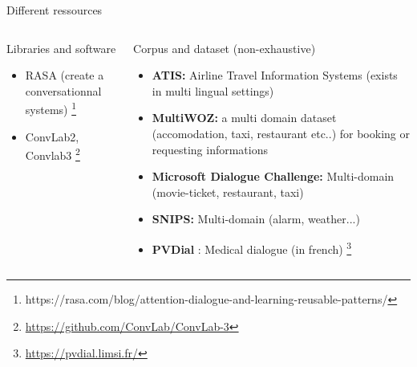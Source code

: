 \documentclass[10pt,aspectratio=169]{beamer}
\begin{document}
\begin{frame}{Different ressources}
\begin{columns}
    \begin{column}{0.5\textwidth}
        \begin{block}{Libraries and software}
            \begin{itemize}
                \item RASA (create a conversationnal systems)  \footnote{https://rasa.com/blog/attention-dialogue-and-learning-reusable-patterns/}
                \item ConvLab2, Convlab3 \footnote{\url{https://github.com/ConvLab/ConvLab-3}}
            \end{itemize}
        \end{block}

    \end{column}
    \begin{column}{0.5\textwidth}
        \begin{block}{Corpus and dataset (non-exhaustive)}
            \begin{itemize}
                \item \textbf{ATIS:}  Airline Travel Information Systems (exists in multi lingual settings)
                \item \textbf{MultiWOZ:} a multi domain dataset (accomodation, taxi, restaurant etc..) for booking or requesting informations
                \item \textbf{Microsoft Dialogue Challenge:} Multi-domain (movie-ticket, restaurant, taxi)
                \item \textbf{SNIPS: } Multi-domain (alarm, weather...)
                \item \textbf{PVDial} : Medical dialogue (in french) \footnote{\url{https://pvdial.limsi.fr/}}
            \end{itemize}
        \end{block}
    \end{column}
\end{columns}
\end{frame}
\end{document}
